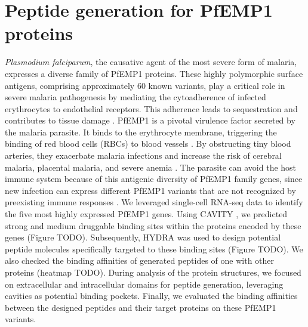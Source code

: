 \section{Peptide generation for PfEMP1 proteins}
\textit{Plasmodium falciparum}, the causative agent of the most severe form of malaria, expresses a diverse family of PfEMP1 proteins. These highly polymorphic surface antigens, comprising approximately 60 known variants, play a critical role in severe malaria pathogenesis by mediating the cytoadherence of infected erythrocytes to endothelial receptors. This adherence leads to sequestration and contributes to tissue damage \cite{jensen2020cerebral}. PfEMP1 is a pivotal virulence factor secreted by the malaria parasite. It binds to the erythrocyte membrane, triggering the binding of red blood cells (RBCs) to blood vessels \cite{pasternak2009pfemp1}. By obstructing tiny blood arteries, they exacerbate malaria infections and increase the risk of cerebral malaria, placental malaria, and severe anemia \cite{jensen2020cerebral}. The parasite can avoid the host immune system because of this antigenic diversity of PfEMP1 family genes, since new infection can express different PfEMP1 variants that are not recognized by preexisting immune responses \cite{scherf2008antigenic}.
We leveraged single-cell RNA-seq data to identify the five most highly expressed PfEMP1 genes. Using CAVITY \cite{Yuan2013}, we predicted strong and medium druggable binding sites within the proteins encoded by these genes (Figure TODO). Subsequently, HYDRA was used to design potential peptide molecules specifically targeted to these binding sites (Figure TODO). We also checked the binding affinities of generated peptides of one with other proteins (heatmap TODO).  During analysis of the protein structures, we focused on extracellular and intracellular domains for peptide generation, leveraging cavities as potential binding pockets. Finally, we evaluated the binding affinities between the designed peptides and their target proteins on these PfEMP1 variants.
